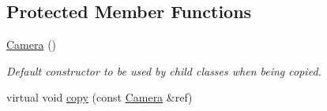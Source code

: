 \subsection*{Protected Member Functions}
\begin{DoxyCompactItemize}
\item 
\mbox{\label{class_geometry_engine_1_1_geometry_world_item_1_1_geometry_camera_1_1_camera_a4721fde7db5f1ebc1c1707910deae277}} 
\mbox{\hyperlink{class_geometry_engine_1_1_geometry_world_item_1_1_geometry_camera_1_1_camera_a4721fde7db5f1ebc1c1707910deae277}{Camera}} ()
\begin{DoxyCompactList}\small\item\em Default constructor to be used by child classes when being copied. \end{DoxyCompactList}\item 
virtual void \mbox{\hyperlink{class_geometry_engine_1_1_geometry_world_item_1_1_geometry_camera_1_1_camera_a821e388a441a9b4a80e8384fc79170e3}{copy}} (const \mbox{\hyperlink{class_geometry_engine_1_1_geometry_world_item_1_1_geometry_camera_1_1_camera}{Camera}} \&ref)
\end{DoxyCompactItemize}
